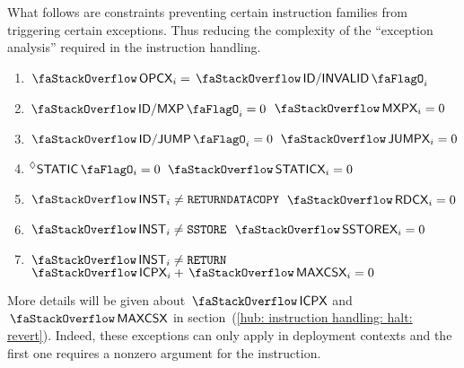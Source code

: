 \begin{center}
\end{center}
What follows are constraints preventing certain instruction families from triggering certain exceptions.
Thus reducing the complexity of the ``exception analysis'' required in the instruction handling.
\begin{enumerate}
	\item $\stackOpcx    _{i} = \stackDecInvalidFlag_{i}$
	\item \If $\stackDecMxpFlag_{i}     = 0$ \Then $\stackMxpx    _{i} = 0$
	\item \If $\stackDecJumpFlag_{i}    = 0$ \Then $\stackJumpx   _{i} = 0$
	\item \If $\decStaticInst_{i}  = 0$ \Then $\stackStaticx _{i} = 0$
	\item \If $\stackInst_{i} \neq \inst{RETURNDATACOPY}$ \Then $ \stackRdcx_{i}    = 0 $
	\item \If $\stackInst_{i} \neq \inst{SSTORE}$         \Then $ \stackSstorex_{i} = 0 $
	\item \If $\stackInst_{i} \neq \inst{RETURN}$         \Then $ \stackIcpx_{i} + \stackMaxcsx_{i} = 0 $
\end{enumerate}
\saNote{}
More details will be given about $\stackIcpx$ and $\stackMaxcsx$ in section~(\ref{hub: instruction handling: halt: revert}). 
Indeed, these exceptions can only apply in deployment contexts and the first one requires a nonzero  argument for the  instruction. 
